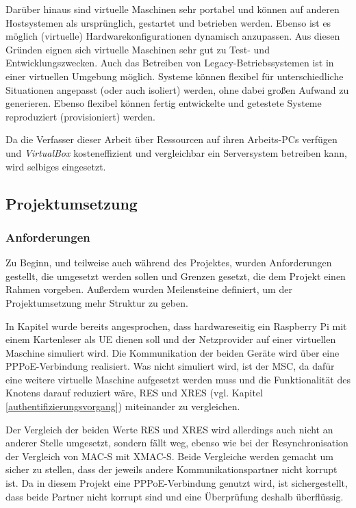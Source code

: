 Darüber hinaus sind virtuelle Maschinen sehr portabel und können auf anderen Hostsystemen als
ursprünglich, gestartet und betrieben werden. Ebenso ist es möglich (virtuelle)
Hardwarekonfigurationen dynamisch anzupassen. Aus diesen Gründen eignen sich virtuelle
Maschinen sehr gut zu Test- und Entwicklungszwecken. Auch das Betreiben von Legacy-Betriebssystemen
ist in einer virtuellen Umgebung möglich. Systeme können flexibel für unterschiedliche
Situationen angepasst (oder auch isoliert) werden, ohne dabei großen Aufwand zu generieren.
Ebenso flexibel können fertig entwickelte und getestete Systeme reproduziert (provisioniert) werden.

Da die Verfasser dieser Arbeit über Ressourcen auf ihren Arbeits-PCs verfügen und \textit{VirtualBox}
kosteneffizient und vergleichbar ein Serversystem betreiben kann, wird selbiges eingesetzt.

\subsection[Projektumsetzung (Heumann)]{Projektumsetzung}
 \subsubsection[Anforderungen (Heumann)]{Anforderungen}
 Zu Beginn, und teilweise auch während des Projektes, wurden Anforderungen
 gestellt, die umgesetzt werden sollen und Grenzen gesetzt, die
 dem Projekt einen Rahmen vorgeben. Außerdem wurden Meilensteine definiert,
 um der Projektumsetzung mehr Struktur zu geben.
 
 In Kapitel  wurde bereits angesprochen, dass hardwareseitig
 ein Raspberry Pi mit einem Kartenleser als \ac{UE} dienen soll und der Netzprovider
 auf einer virtuellen Maschine simuliert wird. Die Kommunikation der beiden Geräte
 wird über eine \ac{PPPoE}-Verbindung realisiert. Was nicht simuliert wird, ist der
 \ac{MSC}, da dafür eine weitere virtuelle Maschine aufgesetzt werden muss und die
 Funktionalität des Knotens darauf reduziert wäre, RES und XRES (vgl. Kapitel \ref{authentifizierungsvorgang})
 miteinander zu vergleichen.
 
 Der Vergleich der beiden Werte RES und XRES wird allerdings auch nicht an anderer
 Stelle umgesetzt, sondern fällt weg, ebenso wie bei der Resynchronisation der Vergleich
 von MAC-S mit XMAC-S. Beide Vergleiche werden gemacht um sicher zu stellen, dass
 der jeweils andere Kommunikationspartner nicht korrupt ist. Da in diesem Projekt eine
 PPPoE-Verbindung genutzt wird, ist sichergestellt, dass beide Partner nicht korrupt sind
 und eine Überprüfung deshalb überflüssig.
 
